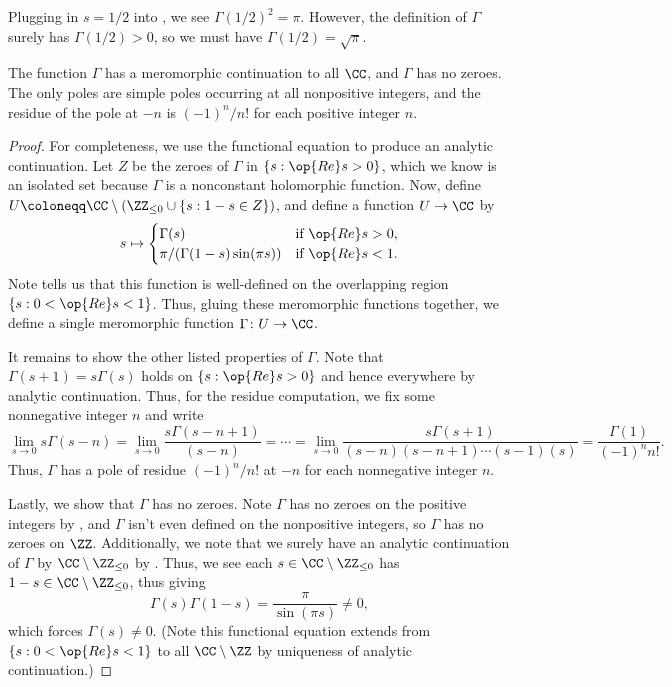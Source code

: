 \documentclass[../notes.tex]{subfiles}
\begin{document}
\begin{example} \label{ex:gamma-half}
	Plugging in $s=1/2$ into , we see $\Gamma(1/2)^2=\pi$. However, the definition of $\Gamma$ surely has $\Gamma(1/2)>0$, so we must have $\Gamma(1/2)=\sqrt\pi$.
\end{example}
\begin{corollary} \label{cor:continue-gamma}
	The function $\Gamma$ has a meromorphic continuation to all $\CC$, and $\Gamma$ has no zeroes. The only poles are simple poles occurring at all nonpositive integers, and the residue of the pole at $-n$ is $(-1)^n/n!$ for each positive integer $n$.
\end{corollary}
\begin{proof}
	For completeness, we use the functional equation to produce an analytic continuation. Let $Z$ be the zeroes of $\Gamma$ in $\{s:\op{Re}s>0\}$, which we know is an isolated set because $\Gamma$ is a nonconstant holomorphic function. Now, define $U\coloneqq\CC\setminus(\ZZ_{\le0}\cup\{s:1-s\in Z\})$, and define a function $U\to\CC$ by
	\[s\mapsto\begin{cases}
		\Gamma(s) & \text{if }\op{Re}s>0, \\
		\pi/(\Gamma(1-s)\sin(\pi s)) & \text{if }\op{Re}s<1.
	\end{cases}\]
	Note  tells us that this function is well-defined on the overlapping region $\{s:0<\op{Re}s<1\}$. Thus, gluing these meromorphic functions together, we define a single meromorphic function $\Gamma\colon U\to\CC$.

	It remains to show the other listed properties of $\Gamma$. Note that $\Gamma(s+1)=s\Gamma(s)$ holds on $\{s:\op{Re}s>0\}$ and hence everywhere by analytic continuation. Thus, for the residue computation, we fix some nonnegative integer $n$ and write
	\[\lim_{s\to0}s\Gamma(s-n)=\lim_{s\to0}\frac{s\Gamma(s-n+1)}{(s-n)}=\cdots=\lim_{s\to0}\frac{s\Gamma(s+1)}{(s-n)(s-n+1)\cdots(s-1)(s)}=\frac{\Gamma(1)}{(-1)^nn!}.\]
	Thus, $\Gamma$ has a pole of residue $(-1)^n/n!$ at $-n$ for each nonnegative integer $n$.
	
	Lastly, we show that $\Gamma$ has no zeroes. Note $\Gamma$ has no zeroes on the positive integers by , and $\Gamma$ isn't even defined on the nonpositive integers, so $\Gamma$ has no zeroes on $\ZZ$. Additionally, we note that we surely have an analytic continuation of $\Gamma$ by $\CC\setminus\ZZ_{\le0}$ by . Thus, we see each $s\in\CC\setminus\ZZ_{\le0}$ has $1-s\in\CC\setminus\ZZ_{\le0}$, thus giving
	\[\Gamma(s)\Gamma(1-s)=\frac\pi{\sin(\pi s)}\ne0,\]
	which forces $\Gamma(s)\ne0$. (Note this functional equation extends from $\{s:0<\op{Re}s<1\}$ to all $\CC\setminus\ZZ$ by uniqueness of analytic continuation.)
\end{proof}
\end{document}
